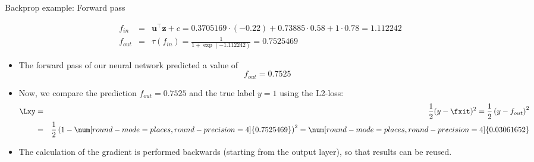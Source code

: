 \begin{vbframe}{Backprop example: Forward pass}
\vspace*{-0.5cm}

  \begin{footnotesize}
    \begin{eqnarray*}
    f_{in} &=& \bm{u}^\top \bm{z} + c = \num[round-mode=places,round-precision=4]{0.3705169} \cdot (-0.22) + \num[round-mode=places,round-precision=4]{0.73885} \cdot 0.58 + 1 \cdot 0.78 = \num[round-mode=places,round-precision=4]{1.112242} \\
    f_{out} &=& \tau\left(f_{in}\right) = \frac{1}{1+\exp(\num[round-mode=places,round-precision=4]{-1.112242})} = \num[round-mode=places,round-precision=4]{0.7525469}
    \end{eqnarray*}
  \end{footnotesize}
\framebreak

  \begin{itemize}
    \item The forward pass of our neural network predicted a value of $$f_{out} = 0.7525$$
    \item Now, we compare the prediction $f_{out} = 0.7525$ and the true label $y = 1$ using the L2-loss: 
      \begin{eqnarray*}
        \Lxy &=& \frac{1}{2}(y - \fxit)^2 = \frac{1}{2}\left(y - f_{out}\right)^{2} \\
                  &=& \frac{1}{2}\left(1 - \num[round-mode=places,round-precision=4]{0.7525469}\right)^2 = \num[round-mode=places,round-precision=4]{0.03061652}
      \end{eqnarray*}
    \item The calculation of the gradient is performed backwards (starting from the output layer), so that results can be reused. 
\end{itemize}
\end{vbframe}

